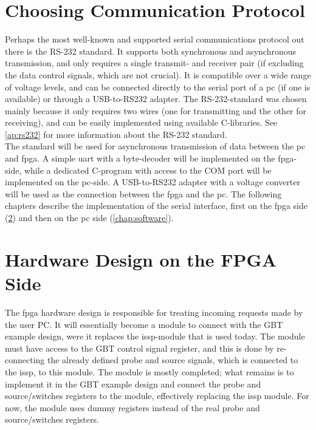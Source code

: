 \documentclass[main.tex]{subfiles}
\begin{document}
\section{Choosing Communication Protocol}
Perhaps the most well-known and supported serial communications protocol out there is the RS-232 standard. It supports both synchronous and asynchronous transmission, and only requires a single transmit- and receiver pair (if excluding the data control signals, which are not crucial). It is compatible over a wide range of voltage levels, and can be connected directly to the serial port of a \acrshort{pc} (if one is available) or through a USB-to-RS232 adapter. The RS-232-standard was chosen mainly because it only requires two wires (one for transmitting and the other for receiving), and can be easily implemented using available C-libraries. See \ref{ap:rs232} for more information about the RS-232 standard.\\

The standard will be used for asynchronous transmission of data between the \acrshort{pc} and \gls{fpga}. A simple \gls{uart} with a byte-decoder will be implemented on the \gls{fpga}-side, while a dedicated C-program with access to the COM port will be implemented on the \acrshort{pc}-side. A USB-to-RS232 adapter with a voltage converter will be used as the connection between the \gls{fpga} and the \acrshort{pc}. The following chapters describe the implementation of the serial interface, first on the \gls{fpga} side (\ref{chap:hardware}) and then on the \acrshort{pc} side (\ref{chap:software}).


\section{Hardware Design on the FPGA Side} \label{chap:hardware}

The \gls{fpga} hardware design is responsible for treating incoming requests made by the user PC. It will essentially become a module to connect with the GBT example design, were it replaces the \gls{issp}-module that is used today. The module must have access to the GBT control signal register, and this is done by re-connecting the already defined probe and source signals, which is connected to the \gls{issp}, to this module. The module is mostly completed; what remains is to implement it in the GBT example design and connect the probe and source/switches registers to the module, effectively replacing the \gls{issp} module. For now, the module uses dummy registers instead of the real probe and source/switches registers. 
\end{document}
